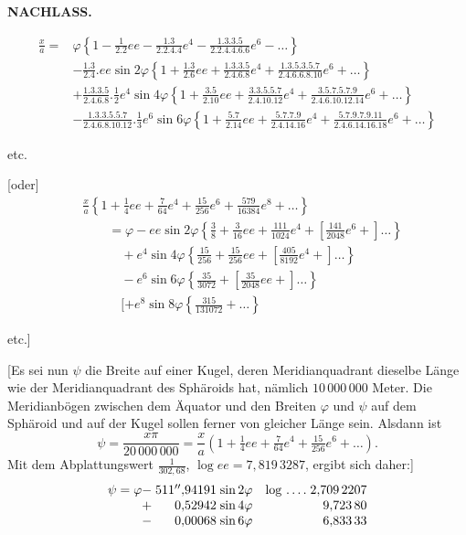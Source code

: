 \par\clearpage
{}\hfill{\small\textbf{NACHLASS.}}\hfill\null\par\medskip
\[
\begin{aligned}
\frac{x}{a}={}&\varphi\left\{1-\frac1{2.2}ee-\frac{1.3}{2.2.4.4}e^4-\frac{1.3.3.5}{2.2.4.4.6.6}e^6-\ldots\right\}\\
&-\frac{1.3}{2.4}.ee\sin2\varphi\left\{1+\frac{1.3}{2.6}ee+\frac{1.3.3.5}{2.4.6.8}e^4+\frac{1.3.5.3.5.7}{2.4.6.6.8.10}e^6+\ldots\right\}\\
&+\frac{1.3.3.5}{2.4.6.8}.\tfrac12e^4\sin4\varphi\left\{1+\frac{3.5}{2.10}ee+\frac{3.3.5.5.7}{2.4.10.12}e^4+\frac{3.5.7.5.7.9}{2.4.6.10.12.14}e^6+\ldots\right\}\\
&-\frac{1.3.3.5.5.7}{2.4.6.8.10.12}.\tfrac13e^6\sin6\varphi\left\{1+\frac{5.7}{2.14}ee+\frac{5.7.7.9}{2.4.14.16}e^4+\frac{5.7.9.7.9.11}{2.4.6.14.16.18}e^6+\ldots\right\}
\end{aligned}
\]
{\centering etc.\par}
[oder]
\[
\begin{aligned}
&\frac{x}{a}\left\{1+\tfrac14ee+\tfrac7{64}e^4+\tfrac{15}{256}e^6+\tfrac{579}{16384}e^8+\ldots\right\}\\
&\qquad=\varphi-ee\sin2\varphi\left\{\tfrac38+\tfrac3{16}ee+\tfrac{111}{1024}e^4+[\tfrac{141}{2048}e^6+]\ldots\right\}\\
&\qquad\quad+e^4\sin4\varphi\left\{\tfrac{15}{256}+\tfrac{15}{256}ee+[\tfrac{405}{8192}e^4+]\ldots\right\}\\
&\qquad\quad-e^6\sin6\varphi\left\{\tfrac{35}{3072}+[\tfrac{35}{2048}ee+]\ldots\right\}\\
&\qquad\quad[+e^8\sin8\varphi\left\{\tfrac{315}{131072}+\ldots\right\}
\end{aligned}
\]
{\centering etc.]\par}
[Es sei nun \(\psi\) die Breite auf einer Kugel, deren Meridianquadrant dieselbe Länge wie der Meridianquadrant des Sphäroids hat, nämlich \(10\,000\,000\) Meter. Die Meridianbögen zwischen dem Äquator und den Breiten \(\varphi\) und \(\psi\) auf dem Sphäroid und auf der Kugel sollen ferner von gleicher Länge sein. Alsdann ist
\[
\psi=\frac{x\pi}{20\,000\,000}=\frac{x}{a}\left(1+\tfrac14ee+\tfrac7{64}e^4+\tfrac{15}{256}e^6+\ldots\right).
\]
Mit dem Abplattungswert \(\frac1{302{,}68}\), \(\log ee=7{,}819\,3287\), ergibt sich daher:]
\[
\begin{array}{@{}r@{\;}r@{\;}l@{\quad}l@{\;}r@{}}
\psi=\varphi-&511''{,}94191&\sin2\varphi&\log\,.\,.\,.\,.&2{,}709\,2207\\
+&0{,}52942&\sin4\varphi&&9{,}723\,80\\
-&0{,}00068&\sin6\varphi&&6{,}833\,33
\end{array}
\]
